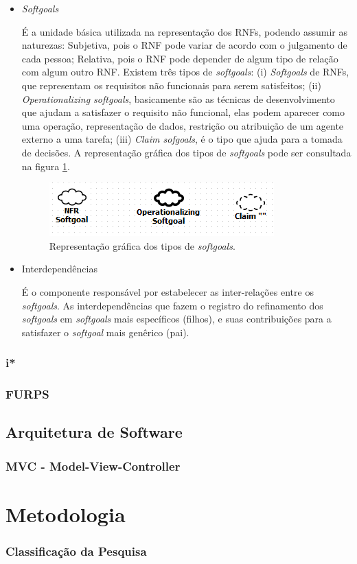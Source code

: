 \begin{itemize}
	\item \textit{Softgoals}
	
	É a unidade básica utilizada na representação dos RNFs, podendo assumir as naturezas: Subjetiva, pois o RNF pode variar de acordo com o julgamento de cada pessoa; Relativa, pois o RNF pode depender de algum tipo de relação com algum outro RNF. Existem três tipos de \textit{softgoals}: (i) \textit{Softgoals} de RNFs, que representam os requisitos não funcionais para serem satisfeitos; (ii) \textit{Operationalizing softgoals}, basicamente são as técnicas de desenvolvimento que ajudam a satisfazer o requisito não funcional, elas podem aparecer como uma operação, representação de dados, restrição ou atribuição de um agente externo a uma tarefa; (iii) \textit{Claim sofgoals}, é o tipo que ajuda para a tomada de decisões. A representação gráfica dos tipos de \textit{softgoals} pode ser consultada na figura \ref{fig01}.
	
	\begin{figure}[h]
		\centering
		\includegraphics[keepaspectratio=true,scale=0.9]{figuras/tiposDeSoftgoals.png}
		\caption{Representação gráfica dos tipos de \textit{softgoals}.}
		\label{fig01}
	\end{figure} 

	\item Interdependências
	
	É o componente responsável por estabelecer as inter-relações entre os \textit{softgoals}. As interdependências que fazem o registro do refinamento dos \textit{softgoals} em \textit{softgoals} mais específicos (filhos), e suas contribuições para a satisfazer o \textit{softgoal} mais genêrico (pai).  
\end{itemize}

\subsection{i*}

\subsection{FURPS}


\section{Arquitetura de Software}

\subsection{MVC - Model-View-Controller}

\chapter{Metodologia}

\subsection{Classificação da Pesquisa}